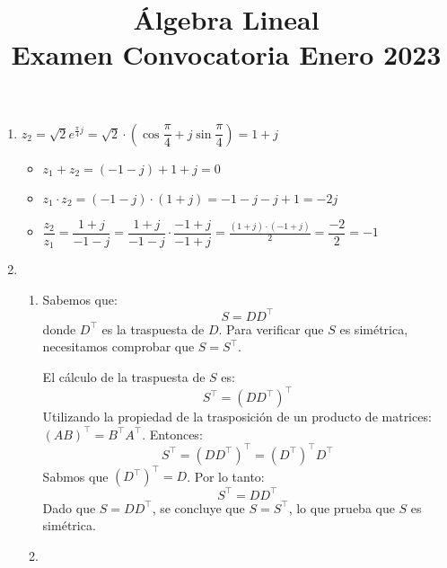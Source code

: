 
\title{Álgebra Lineal\\ Examen Convocatoria Enero 2023}
\renewcommand{\arraystretch}{1}
\setlength{\arraycolsep}{6pt}


\maketitle
\begin{enumerate}[label=\color{red}\textbf{\arabic*)}]
    \item {}

    $z_2=\sqrt{2}e^{\frac{\pi}{4} j} =\sqrt{2} \cdot \left( \cos\dfrac{\pi}{4}+j\sin\dfrac{\pi}{4} \right)= 1+j $
\begin{itemize}[label=\textbullet]
    \item $z_1+z_2=(-1-j)+1+j=0$
    \item $z_1\cdot z_2=(-1-j)\cdot (1+j)=-1-j-j+1=-2j$
    \item $\dfrac{z_2}{z_1}=\dfrac{1+j}{-1-j}=\dfrac{1+j}{-1-j}\cdot \dfrac{-1+j}{-1+j}=\frac{(1+j)\cdot (-1+j)}{2}=\dfrac{-2}{2}=-1$
\end{itemize}
\item {}
    \begin{enumerate}[label=\color{red}\textbf{\alph*)}]
        \item {}

            Sabemos que: \[
            S=DD^\intercal
            \] donde $D^\intercal$ es la traspuesta de $D$. Para verificar que  $S$ es simétrica, necesitamos comprobar que $S=S^\intercal$.

            El cálculo de la traspuesta de $S$ es:  \[
            S^\intercal=( D D^\intercal )^\intercal
            \] 
            Utilizando la propiedad de la trasposición de un producto de matrices: $(AB)^\intercal=B^\intercal A^\intercal$. Entonces: \[
            S^\intercal=(D D^\intercal)^\intercal=(D^\intercal)^\intercal D^\intercal
            \] 
            Sabmos que $(D^\intercal)^\intercal=D$. Por lo tanto: \[
            S^\intercal=D D^\intercal
            \] 
            Dado que $S=DD^\intercal$, se concluye que $S=S^\intercal$, lo que prueba que $S$ es simétrica.
        \item {} 
            

\end{enumerate}
\end{enumerate}
